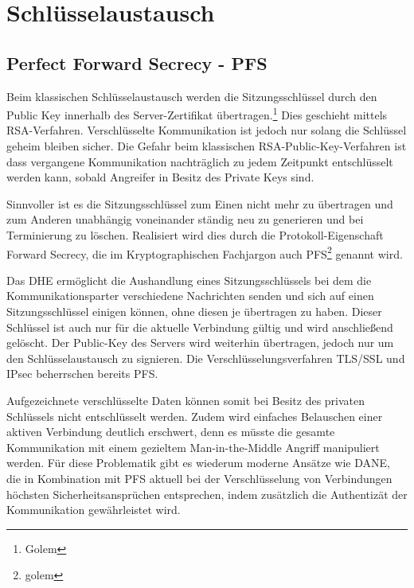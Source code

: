 \chapter{Schlüsselaustausch}

\section{Perfect Forward Secrecy - PFS}
Beim klassischen Schlüsselaustausch werden die Sitzungsschlüssel durch den Public Key innerhalb des Server-Zertifikat übertragen.\footnote{Golem} Dies geschieht mittels RSA-Verfahren. Verschlüsselte Kommunikation ist jedoch nur solang die Schlüssel geheim bleiben sicher. Die Gefahr beim klassischen RSA-Public-Key-Verfahren ist dass vergangene Kommunikation nachträglich zu jedem Zeitpunkt entschlüsselt werden kann, sobald Angreifer in Besitz des Private Keys sind. 

Sinnvoller ist es die Sitzungsschlüssel %
zum Einen nicht mehr zu übertragen und zum Anderen unabhängig voneinander ständig neu zu generieren und bei Terminierung zu löschen. 
Realisiert wird dies durch die Protokoll-Eigenschaft Forward Secrecy, die im Kryptographischen Fachjargon auch \ac{PFS}\footnote{golem} genannt wird.

Das \ac{DHE} ermöglicht die Aushandlung eines Sitzungsschlüssels bei dem die Kommunikationsparter verschiedene Nachrichten senden und sich auf einen Sitzungsschlüssel einigen können, ohne diesen je übertragen zu haben. Dieser Schlüssel ist auch nur für die aktuelle Verbindung gültig und wird anschließend gelöscht. Der Public-Key des Servers wird weiterhin übertragen, jedoch nur um den Schlüsselaustausch zu signieren. Die Verschlüsselungsverfahren \ac{TLS/SSL} und IPsec beherrschen bereits \ac{PFS}.

Aufgezeichnete verschlüsselte Daten können somit bei Besitz des privaten Schlüssels nicht entschlüsselt werden. Zudem wird einfaches Belauschen einer aktiven Verbindung deutlich erschwert, denn es müsste die gesamte Kommunikation mit einem gezieltem Man-in-the-Middle Angriff manipuliert werden. Für diese Problematik gibt es wiederum moderne Ansätze wie DANE, die in Kombination mit PFS aktuell bei der Verschlüsselung von Verbindungen höchsten Sicherheitsansprüchen entsprechen, indem zusätzlich die Authentizät der Kommunikation gewährleistet wird. %

